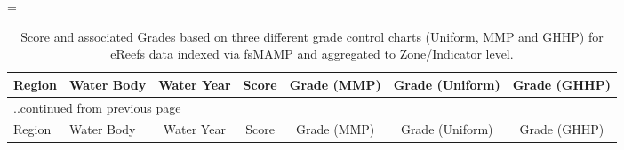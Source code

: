   
\LTcapwidth=\linewidth
\setlength\aboverulesep{0pt}\setlength\belowrulesep{0pt}
\setlength\cmidrulekern{1pt}\setlength\cmidrulewidth{1pt}
\renewcommand\arraystretch{1.2}\setlength\tabcolsep{5pt}
{
\small
\begin{longtable}{llccccc}
\caption{Score and associated Grades based on three different grade control charts (Uniform, MMP and GHHP) for eReefs data indexed via fsMAMP and aggregated to Zone/Indicator level.}\label{tab:GradeTypeComparisons}\\ 
\toprule
Region&Water Body & Water Year & Score & Grade (MMP) & Grade (Uniform) & Grade (GHHP)\\
\midrule
\endfirsthead
\multicolumn{7}{l}{..continued from previous page}\\
\toprule
Region&Water Body & Water Year & Score & Grade (MMP) & Grade (Uniform) & Grade (GHHP)\\
\midrule 

\endhead 

\bottomrule


\end{longtable}}
